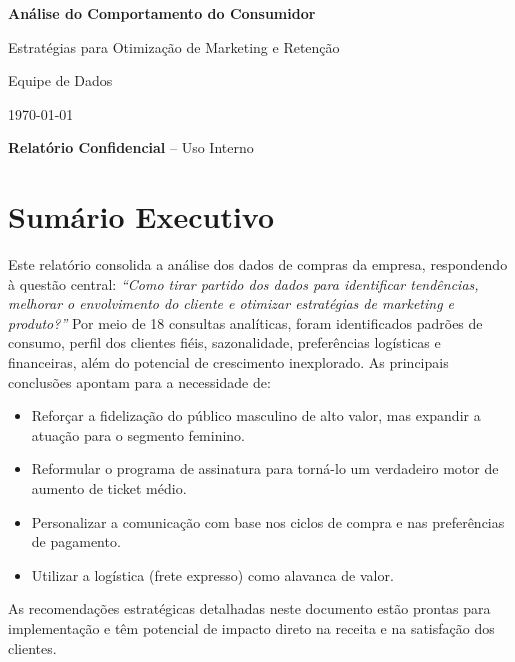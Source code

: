 \documentclass[12pt,a4paper]{article}
\begin{document}
\begin{titlepage}
    \centering
    \vspace*{2cm}
    {\sffamily\Huge\bfseries\color{primary} Análise do Comportamento do Consumidor\par}
    \vspace{1cm}
    {\sffamily\LARGE Estratégias para Otimização de Marketing e Retenção\par}
    \vspace{2cm}
    {\sffamily\large Equipe de Dados\par}
    \vspace{1cm}
    {\sffamily\large \today\par}
    \vfill
    \begin{tcolorbox}[colback=lightgray, colframe=primary, arc=0pt, boxrule=2pt, width=0.8\linewidth, center title]
        \centering
        \sffamily \textbf{Relatório Confidencial} – Uso Interno
    \end{tcolorbox}
\end{titlepage}

\tableofcontents
\newpage

\section*{Sumário Executivo}
Este relatório consolida a análise dos dados de compras da empresa, respondendo à questão central: \textit{“Como tirar partido dos dados para identificar tendências, melhorar o envolvimento do cliente e otimizar estratégias de marketing e produto?”} Por meio de 18 consultas analíticas, foram identificados padrões de consumo, perfil dos clientes fiéis, sazonalidade, preferências logísticas e financeiras, além do potencial de crescimento inexplorado. As principais conclusões apontam para a necessidade de:
\begin{itemize}
    \item Reforçar a fidelização do público masculino de alto valor, mas expandir a atuação para o segmento feminino.
    \item Reformular o programa de assinatura para torná-lo um verdadeiro motor de aumento de ticket médio.
    \item Personalizar a comunicação com base nos ciclos de compra e nas preferências de pagamento.
    \item Utilizar a logística (frete expresso) como alavanca de valor.
\end{itemize}
As recomendações estratégicas detalhadas neste documento estão prontas para implementação e têm potencial de impacto direto na receita e na satisfação dos clientes.
\end{document}
